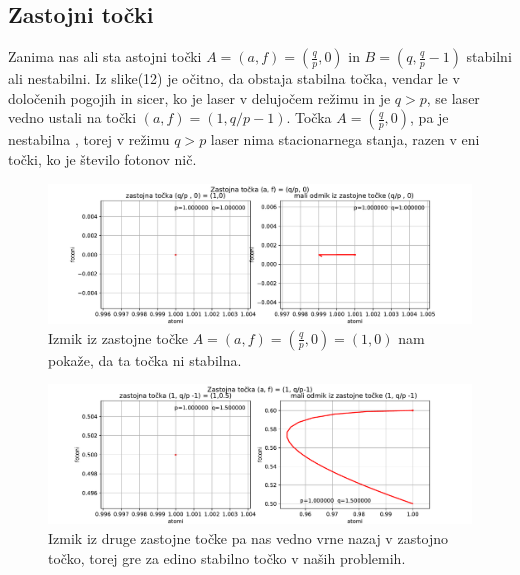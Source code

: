 \documentclass[11pt, a4paper]{article}
\begin{document}
\subsection{Zastojni točki}
Zanima nas ali sta astojni točki $A =(a,f)= (\frac{q}{p},0)$ in $ B= (q, \frac{q}{p}-1)$ stabilni ali nestabilni. Iz slike(12) je očitno, da obstaja stabilna točka, vendar le v določenih pogojih in sicer, ko je laser v delujočem režimu in je $q>p$, se laser vedno ustali na točki $(a,f) = (1, q/p - 1)$.
Točka $A =  (\frac{q}{p},0)$, pa je nestabilna , torej v režimu $q>p$ laser nima stacionarnega stanja, razen v eni točki, ko je število fotonov nič.


\begin{figure}[htb!]
  \centering
  \includegraphics[width=18cm]{laser_zastojna_tocka_1.pdf}
  \caption{Izmik iz zastojne točke $A =(a,f)= (\frac{q}{p},0) = (1,0)$ nam pokaže, da ta točka ni stabilna.}
\end{figure}

\begin{figure}[htb!]
  \centering
  \includegraphics[width=18cm]{laser_zastojna_tocka_2.pdf}
  \caption{Izmik iz druge zastojne točke pa nas vedno vrne nazaj v zastojno točko, torej gre za edino stabilno točko v naših problemih.}
\end{figure}
\end{document}
